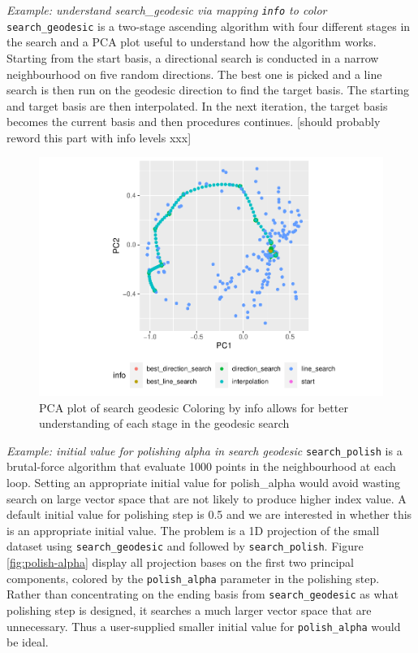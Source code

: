 \documentclass[12pt]{article}
\begin{document}
\emph{Example: understand search\_geodesic via mapping \texttt{info} to
color} \texttt{search\_geodesic} is a two-stage ascending algorithm with
four different stages in the search and a PCA plot useful to understand
how the algorithm works. Starting from the start basis, a directional
search is conducted in a narrow neighbourhood on five random directions.
The best one is picked and a line search is then run on the geodesic
direction to find the target basis. The starting and target basis are
then interpolated. In the next iteration, the target basis becomes the
current basis and then procedures continues. {[}should probably reword
this part with info levels xxx{]}

\begin{figure}
\centering
\includegraphics{paper_files/figure-latex/pca-1.pdf}
\caption{\label{pca}PCA plot of search geodesic Coloring by info allows
for better understanding of each stage in the geodesic search}
\end{figure}

\emph{Example: initial value for polishing alpha in search geodesic}
\texttt{search\_polish} is a brutal-force algorithm that evaluate 1000
points in the neighbourhood at each loop. Setting an appropriate initial
value for polish\_alpha would avoid wasting search on large vector space
that are not likely to produce higher index value. A default initial
value for polishing step is 0.5 and we are interested in whether this is
an appropriate initial value. The problem is a 1D projection of the
small dataset using \texttt{search\_geodesic} and followed by
\texttt{search\_polish}. Figure \ref{fig:polish-alpha} display all
projection bases on the first two principal components, colored by the
\texttt{polish\_alpha} parameter in the polishing step. Rather than
concentrating on the ending basis from \texttt{search\_geodesic} as what
polishing step is designed, it searches a much larger vector space that
are unnecessary. Thus a user-supplied smaller initial value for
\texttt{polish\_alpha} would be ideal.
\end{document}
